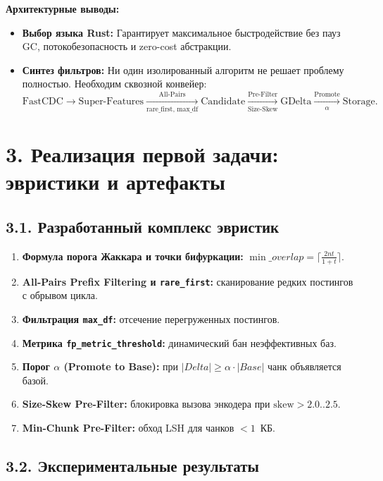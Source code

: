 \documentclass[a4paper,14pt]{extarticle}
\begin{document}
\textbf{Архитектурные выводы:}
\begin{itemize}
    \item \textbf{Выбор языка Rust:} Гарантирует максимальное быстродействие без пауз GC, потокобезопасность и zero-cost абстракции.
    \item \textbf{Синтез фильтров:} Ни один изолированный алгоритм не решает проблему полностью. Необходим сквозной конвейер:
    \begin{equation}
        \text{FastCDC} \longrightarrow \text{Super-Features} \xrightarrow[\text{rare\_first, max\_df}]{\text{All-Pairs}} \text{Candidate} \xrightarrow[\text{Size-Skew}]{\text{Pre-Filter}} \text{GDelta} \xrightarrow[\alpha]{\text{Promote}} \text{Storage}.
    \end{equation}
\end{itemize}

\newpage

\section*{3. Реализация первой задачи: эвристики и артефакты}

\subsection*{3.1. Разработанный комплекс эвристик}
\begin{enumerate}
    \item \textbf{Формула порога Жаккара и точки бифуркации:} $\min\_overlap = \lceil \frac{2nt}{1+t} \rceil$.
    \item \textbf{All-Pairs Prefix Filtering и \texttt{rare\_first}:} сканирование редких постингов с обрывом цикла.
    \item \textbf{Фильтрация \texttt{max\_df}:} отсечение перегруженных постингов.
    \item \textbf{Метрика \texttt{fp\_metric\_threshold}:} динамический бан неэффективных баз.
    \item \textbf{Порог $\alpha$ (Promote to Base):} при $|Delta| \ge \alpha \cdot |Base|$ чанк объявляется базой.
    \item \textbf{Size-Skew Pre-Filter:} блокировка вызова энкодера при $\text{skew} > 2.0..2.5$.
    \item \textbf{Min-Chunk Pre-Filter:} обход LSH для чанков $< 1$~КБ.
\end{enumerate}

\subsection*{3.2. Экспериментальные результаты}
\end{document}
